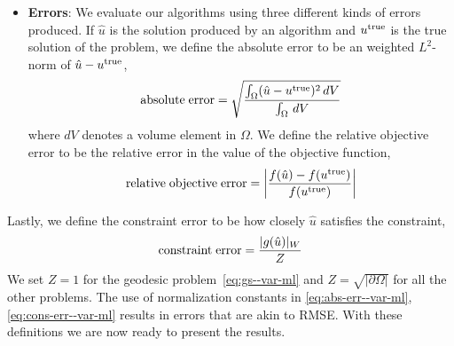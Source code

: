 \begin{itemize}
\item\textbf{Errors}: We evaluate our algorithms using three different kinds of errors produced.
If $\hat u$ is the solution produced by an algorithm and $u^{\rm true}$ is the true solution of the problem, we define the absolute error to be an weighted $L^2$-norm  of $\hat u-u^{\rm true}$,
\begin{align}
{\rm absolute\;error}=\sqrt{\frac{\int_{\Omega}(\hat u-u^{\rm true})^2\,dV}{\int_{\Omega}\,dV}}\label{eq:abs-err--var-ml}
\end{align}
where $dV$ denotes a volume element in $\Omega$. We define the relative objective error to be the relative error in the value of the objective function, 
\begin{align}
{\rm relative\; objective\; error}=\left|\frac{f(\hat u)-f(u^{\rm true})}{f(u^{\rm true})}\right|\label{eq:rel-err--var-ml}
\end{align}
\end{itemize}
Lastly, we define the constraint error to be how closely $\hat u$ satisfies the constraint,
\begin{align}
    {\rm constraint\; error}= \frac{|g(\hat u)|_W}{Z}\label{eq:cons-err--var-ml}
\end{align}
We set $Z=1$ for the geodesic problem~\eqref{eq:gs--var-ml} and $Z=\sqrt{|\partial\Omega|}$ for all the other problems. The use of normalization constants in \eqref{eq:abs-err--var-ml}, \eqref{eq:cons-err--var-ml} results in errors that are akin to RMSE. With these definitions we are now ready to present the results.     


